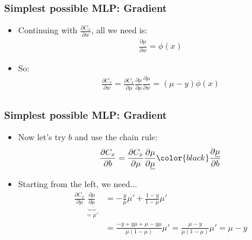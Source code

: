 \documentclass{beamer}
\begin{document}
\begin{frame}
\frametitle{Simplest possible MLP: Gradient}

\begin{itemize}
\item Continuing with $\frac{\partial C_x}{\partial w}$, all we need is: 
\begin{align*}
\frac{\partial \underline{\mu}}{\partial w} = \phi(x)
\end{align*}
\item So:
\begin{align*}
\frac{\partial C_x}{\partial w} = \frac{\partial C_x}{\partial \mu}
    \frac{\partial \mu}{\partial \underline{\mu}}
    \frac{\partial \underline{\mu}}{\partial w} = (\mu - y)\phi(x)
\end{align*}
\end{itemize}

\end{frame}


\begin{frame}
\frametitle{Simplest possible MLP: Gradient}

\begin{itemize}
\item Now let's try $b$ and use the chain rule:
\begin{align*}
    \frac{\partial C_x}{\partial b} = \frac{\partial C_x}{\partial \mu}
    \frac{\partial \mu}{\partial \underline{\mu}}\color{black}
    \frac{\partial \underline{\mu}}{\partial b}
\end{align*}
\item Starting from the left, we need...
\begin{align*}
    \frac{\partial C_x}{\partial \mu} \underbrace{\frac{\partial \mu}{\partial
    \underline{\mu}}}_{=\mu'} & = 
    -\frac{y}{\mu}\mu' +
    \frac{1-y}{1-\mu}\mu'\\ 
   & = \frac{-y + y\mu + \mu - y\mu }{\mu(1-\mu)}\mu' 
    = \frac{\mu - y}{\mu(1-\mu)}\mu' 
    = \mu - y
\end{align*}
\end{itemize}

\end{frame}
\end{document}
